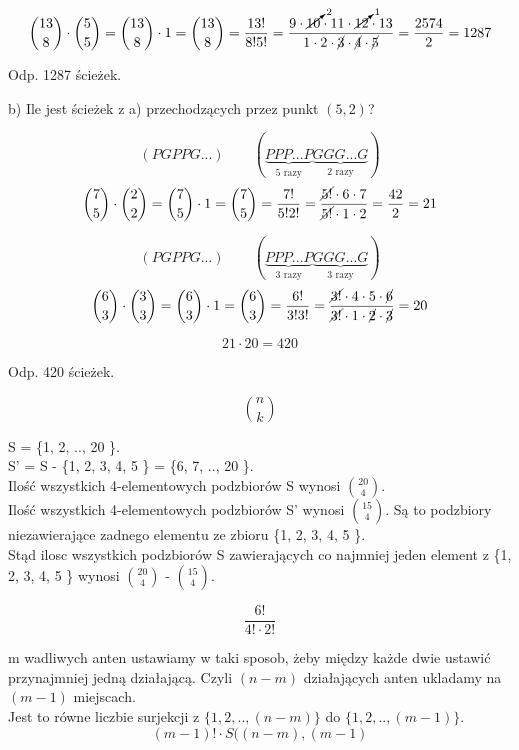 \documentclass[fleqn]{article}
\begin{document}
\[{13 \choose 8} \cdot {5 \choose 5}
={13 \choose 8} \cdot 1={13 \choose 8}
= \frac{13!}{8!5!}
= \frac{9 \cdot \cancelto{2}{10} \cdot 11 \cdot \cancelto{1}{12} \cdot 13}
{1 \cdot 2 \cdot \cancel{3} \cdot \cancel{4} \cdot \cancel{5}}
= \frac{2574}{2}=1287\]

Odp. 1287 ścieżek.

\vspace{1em}

b) Ile jest ścieżek z a) przechodzących przez punkt $(5, 2)$?

\[(PGPPG...) \qquad
(\underbrace{PPP...P}_{\displaystyle\text{5 razy}}
\underbrace{GGG...G}_{\displaystyle\text{2 razy}})\]
\[{7 \choose 5} \cdot {2 \choose 2}
= {7 \choose 5} \cdot 1
= {7 \choose 5}
= \frac{7!}{5!2!}
= \frac{\cancel{5!} \cdot 6 \cdot 7}{\cancel{5!} \cdot 1 \cdot 2}
= \frac{42}{2}=21\]

\[(PGPPG...) \qquad
(\underbrace{PPP...P}_{\displaystyle\text{3 razy}}\underbrace{GGG...G}_{\displaystyle\text{3 razy}})\]
\[{6 \choose 3} \cdot {3 \choose 3}
={6 \choose 3} \cdot 1
={6 \choose 3}
=\frac{6!}{3!3!}
=\frac{\cancel{3!} \cdot 4 \cdot 5 \cdot \cancel{6}}
{\cancel{3!} \cdot 1 \cdot \cancel{2} \cdot \cancel{3}}
= 20\]

\[21  \cdot  20 = 420\]

Odp. 420 ścieżek.
\medskip

\medskip
\[{n\choose k}\]
\medskip

\medskip

S = \big\{1, 2, .., 20 \big\}. \\
S' = S - \big\{1, 2, 3, 4, 5 \big\} = \big\{6, 7, .., 20 \big\}. \\
Ilość wszystkich 4-elementowych podzbiorów S wynosi ${20 \choose 4}$. \\
Ilość wszystkich 4-elementowych podzbiorów S' wynosi ${15 \choose 4}$. Są to podzbiory niezawierające zadnego elementu ze zbioru \big\{1, 2, 3, 4, 5 \big\}.\\
Stąd ilosc wszystkich podzbiorów S zawierających co najmniej jeden element z \big\{1, 2, 3, 4, 5 \big\} wynosi ${20 \choose 4}$ - ${15 \choose 4}$.\\

\medskip

\medskip
\[\frac{6!}{4! \cdot 2!}\]
\medskip

\medskip

m wadliwych anten ustawiamy w taki sposob, żeby między każde dwie ustawić przynajmniej jedną działającą. Czyli $(n - m)$ działających anten ukladamy na $(m - 1)$ miejscach. \\
Jest to równe liczbie surjekcji z $\big\{1, 2, .., (n-m) \big\}$ do $\big\{1, 2, .., (m-1) \big\}$. \\
\[(m-1)! \cdot S((n-m), (m-1)\]
\end{document}
